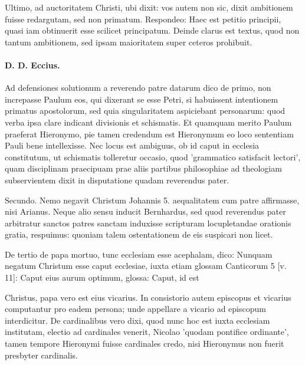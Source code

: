 Ultimo, ad auctoritatem Christi, ubi dixit: vos autem non sic, dixit ambitionem fuisse redargutam, sed non primatum. Respondeo: Haec est petitio principii, quasi iam obtinuerit esse scilicet principatum. Deinde clarus est textus, quod non tantum ambitionem, sed ipsam maioritatem super ceteros prohibuit.

\paragraph*{D. D. Eccius.}

Ad defensiones solutionum a reverendo patre datarum dico de primo, non increpasse Paulum eos, qui dixerant se esse Petri, si habuissent intentionem primatus apostolorum, sed quia singularitatem aspiciebant personarum: quod verba ipsa clare indicant divisionis et schismatis. Et quamquam merito Paulum praeferat Hieronymo, pie tamen credendum est Hieronymum eo loco sententiam Pauli bene intellexisse. Nec locus est ambiguus, ob id caput in ecclesia constitutum, ut schismatis tolleretur occasio, quod 'grammatico satisfacit lectori', quam disciplinam praecipuam prae aliis partibus philosophiae ad theologiam subservientem dixit in disputatione quadam reverendus pater.

Secundo. Nemo negavit Christum Johannis 5. aequalitatem cum patre affirmasse, nisi Arianus. Neque alio sensu inducit Bernhardus, sed quod reverendus pater arbitratur sanctos patres sanctam induxisse scripturam \marginpar{\small[268]} locupletandae orationis gratia, respuimus: quoniam talem ostentationem de eis suspicari non licet.

De tertio de papa mortuo, tunc ecclesiam esse acephalam, dico: Nunquam negatum Christum esse caput ecclesiae, iuxta etiam glossam Canticorum 5 [v. 11]: Caput eius aurum optimum, glossa: Caput, id est

Christus, papa vero est eius vicarius. In consistorio autem episcopus et vicarius computantur pro eadem persona; unde appellare a vicario ad episcopum interdicitur. De cardinalibus vero dixi, quod nunc hoc est iuxta ecclesiam institutam, electio ad cardinales venerit, Nicolao 'quodam pontifice ordinante', tamen tempore Hieronymi fuisse cardinales credo, nisi Hieronymus non fuerit presbyter cardinalis.

